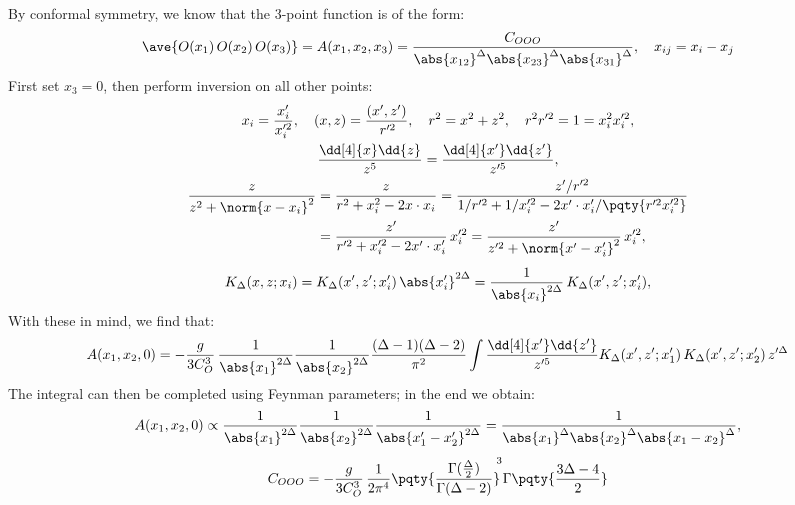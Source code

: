 \documentclass[a4paper,10pt]{article}
\begin{document}
\begin{enumerate}
\begin{enumerate}
	By conformal symmetry, we know that the 3-point function is of the form:
	\begin{equation}
		\ave{O(x_1)\,O(x_2)\,O(x_3)}
		= A(x_1,x_2,x_3)
		= \frac{C_{OOO}}{
				\abs{x_{12}}^\Delta
				\abs{x_{23}}^\Delta
				\abs{x_{31}}^\Delta
			},\quad x_{ij} = x_i - x_j
	\end{equation}
	First set $x_3 = 0$, then perform inversion on all other points:
	\begin{gather}
		x_i = \frac{x'_i}{x'^2_i}, \quad
		(x,z) = \frac{(x',z')}{\,r'^2},
	\quad
		r^2 = x^2 + z^2,\quad
		r^2 r'^2 = 1 = x_i^2 x_i'^2,
	\\
		\frac{\dd[4]{x} \dd{z}}{z^5}
		= \frac{\dd[4]{x'} \dd{z'}}{z'^5},
	\\
	\begin{aligned}
		\frac{z}{z^2 + \norm{x - x_i}^2}
		&= \frac{z}{r^2 + x_i^2 - 2x\cdot x_i}
		= \frac{z'/r'^2}{
				1/r'^2 + 1/x'^2_i
				- 2x'\cdot x'_i/\pqty{r'^2 x'^2_i}
			} \\
		&= \frac{z'}{r'^2 + x'^2_i - 2x'\cdot x'_i}
			\,x'^2_i
		= \frac{z'}{z'^2 + \norm{x' - x'_i}^2}
			\,x'^2_i,
	\end{aligned}
	\\[1ex]
		K_\Delta(x,z;x_i)
		= K_\Delta(x',z';x'_i)\,\abs{x'_i}^{2\Delta}
		= \frac{1}{\abs{x_i}^{2\Delta}}\,
			K_\Delta(x',z';x'_i),
	\end{gather}
	With these in mind, we find that:
	\begin{equation}
		A(x_1,x_2,0)
		= -\frac{g}{3C_O^3}\,
			\frac{1}{\abs{x_1}^{2\Delta}}
			\frac{1}{\abs{x_2}^{2\Delta}}
			\frac{(\Delta - 1)(\Delta - 2)}{\pi^2}
		\int \frac{\dd[4]{x'} \dd{z'}}{z'^5}
			K_\Delta(x',z';x'_1)\,
			K_\Delta(x',z';x'_2)\,
			z'^\Delta
	\end{equation}
	The integral can then be completed using Feynman parameters; in the end we obtain:
	\begin{gather}
		A(x_1,x_2,0)
		\propto
			\frac{1}{\abs{x_1}^{2\Delta}}
			\frac{1}{\abs{x_2}^{2\Delta}}
			\frac{1}{\abs{x'_1 - x'_2}^{2\Delta}}
		= \frac{1}{
				\abs{x_1}^{\Delta}
				\abs{x_2}^{\Delta}
				\abs{x_1 - x_2}^{\Delta}
			},
	\\[1ex]
		C_{OOO}
		= -\frac{g}{3C_O^3}\,
			\frac{1}{2\pi^4}
			\pqty{
				\frac{\Gamma(\tfrac{\Delta}{2})}{
					\Gamma(\Delta - 2)
				}
			}^{\!\!3}
			\Gamma\pqty{
				\frac{3\Delta - 4}{2}
			}
	\end{gather}
	
	
	
	
	
	
	
	
	
	
	\end{enumerate}
	
	
	
	
	
	
	
	
	
	
	
	

\end{enumerate}

\printbibliography[%
	,heading = bibintoc
]
\end{document}

